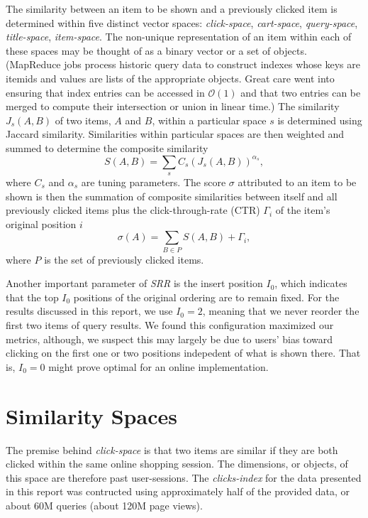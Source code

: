 \documentclass{article}
\begin{document}
The similarity between an item to be shown and a previously clicked item is
determined within five distinct vector spaces: {\em click-space}, {\em
cart-space}, {\em query-space}, {\em title-space}, {\em item-space}. The
non-unique representation of an item within each of these spaces may be thought
of as a binary vector or a set of objects. (MapReduce jobs process historic
query data to construct indexes whose keys are itemids and values are lists of
the appropriate objects. Great care went into ensuring that index entries can be
accessed in $\mathcal{O}(1)$ and that two entries can be merged to compute their
intersection or union in linear time.) The similarity $J_s(A, B)$ of two items,
$A$ and $B$, within a particular space $s$ is determined using Jaccard
similarity. Similarities within particular spaces are then weighted and summed
to determine the composite similarity
\begin{equation}\label{eqn:similarity_metric}
    S(A, B) = \sum_s{C_s(J_s(A, B))^{\alpha_s}},
\end{equation}
where $C_s$ and $\alpha_s$ are tuning parameters. The score $\sigma$ attributed
to an item to be shown is then the summation of composite similarities between
itself and all previously clicked items plus the click-through-rate (CTR)
$\Gamma_i$ of the item's original position $i$
\begin{equation*}\label{eqn:rerank_score}
    \sigma(A) = \sum_{B \in P}{S(A, B)} + \Gamma_i,
\end{equation*}
where $P$ is the set of previously clicked items. 

Another important parameter of {\em SRR} is the insert position $I_0$, which
indicates that the top $I_0$ positions of the original ordering are to remain
fixed. For the results discussed in this report, we use $I_0 = 2$, meaning that
we never reorder the first two items of query results. We found this configuration
maximized our metrics, although, we suspect this may largely be due to users'
bias toward clicking on the first one or two positions indepedent of what is
shown there. That is, $I_0 = 0$ might prove optimal for an online implementation.

\section{Similarity Spaces}\label{sec:similarity_spaces}

The premise behind {\em click-space} is that two items are similar if they are
both clicked within the same online shopping session. The dimensions, or
objects, of this space are therefore past user-sessions. The {\em clicks-index}
for the data presented in this report was contructed using approximately half of
the provided data, or about 60M queries (about 120M page views).
\end{document}
